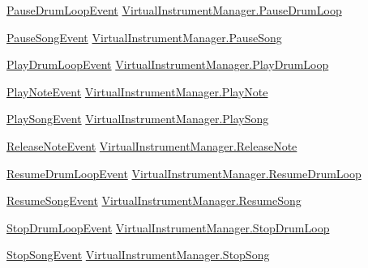 \begin{DoxyCompactItemize}
\hyperlink{group___v_i_m_event_types_class_virtual_instrument_manager_1_1_pause_drum_loop_event}{Pause\+Drum\+Loop\+Event} \hyperlink{group___v_i_m_events_ga6de00a430321852cc3c8c4a213d62c70}{Virtual\+Instrument\+Manager.\+Pause\+Drum\+Loop}
\item 
\hyperlink{group___v_i_m_event_types_class_virtual_instrument_manager_1_1_pause_song_event}{Pause\+Song\+Event} \hyperlink{group___v_i_m_events_gae2d76fc98161d7a4573628dbd93e7887}{Virtual\+Instrument\+Manager.\+Pause\+Song}
\item 
\hyperlink{group___v_i_m_event_types_class_virtual_instrument_manager_1_1_play_drum_loop_event}{Play\+Drum\+Loop\+Event} \hyperlink{group___v_i_m_events_ga5657ff4bcc7de6d240d7092ffd22a6fe}{Virtual\+Instrument\+Manager.\+Play\+Drum\+Loop}
\item 
\hyperlink{group___v_i_m_event_types_class_virtual_instrument_manager_1_1_play_note_event}{Play\+Note\+Event} \hyperlink{group___v_i_m_events_gaa21021c13a8c9d13cbf374d5bf9d68fa}{Virtual\+Instrument\+Manager.\+Play\+Note}
\item 
\hyperlink{group___v_i_m_event_types_class_virtual_instrument_manager_1_1_play_song_event}{Play\+Song\+Event} \hyperlink{group___v_i_m_events_gae450bdba9c513ab4e43f69def50fa84d}{Virtual\+Instrument\+Manager.\+Play\+Song}
\item 
\hyperlink{group___v_i_m_event_types_class_virtual_instrument_manager_1_1_release_note_event}{Release\+Note\+Event} \hyperlink{group___v_i_m_events_ga3a1726a6366126421434c2c7be5e5678}{Virtual\+Instrument\+Manager.\+Release\+Note}
\item 
\hyperlink{group___v_i_m_event_types_class_virtual_instrument_manager_1_1_resume_drum_loop_event}{Resume\+Drum\+Loop\+Event} \hyperlink{group___v_i_m_events_ga54db2dc24076cd3cd130e95c2fd5bea0}{Virtual\+Instrument\+Manager.\+Resume\+Drum\+Loop}
\item 
\hyperlink{group___v_i_m_event_types_class_virtual_instrument_manager_1_1_resume_song_event}{Resume\+Song\+Event} \hyperlink{group___v_i_m_events_ga01670916ae3917c84a0fb51667f30ab9}{Virtual\+Instrument\+Manager.\+Resume\+Song}
\item 
\hyperlink{group___v_i_m_event_types_class_virtual_instrument_manager_1_1_stop_drum_loop_event}{Stop\+Drum\+Loop\+Event} \hyperlink{group___v_i_m_events_ga9466995fd3b4a07351a8577042ee8b31}{Virtual\+Instrument\+Manager.\+Stop\+Drum\+Loop}
\item 
\hyperlink{group___v_i_m_event_types_class_virtual_instrument_manager_1_1_stop_song_event}{Stop\+Song\+Event} \hyperlink{group___v_i_m_events_gaa9e464629814abf2e4db88e240fac72c}{Virtual\+Instrument\+Manager.\+Stop\+Song}
\end{DoxyCompactItemize}


